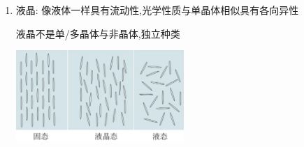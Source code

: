 \documentclass{article}
\begin{document}
\begin{enumerate}
\begin{enumerate}[label = (\arabic*)]
\begin{minipage}{0.7\textwidth}
                        非浸润时尽可能排斥固体分子(水银液面下降)

                        试管越细,那么管内的液体则越少,毛细现象越明显

                        \vspace{-1em}
                        \hspace{-0.9em}\begin{adjustbox}{minipage=0.7\linewidth, bgcolor=gray!20, padding=1em}
                            \small 
                            液面上升高度 $\, h= \dfrac{2\gamma \cos{\theta}}{\rho gr} \quad $($\theta$:液面切线与固体面所成锐角)

                            $\gamma$:表面张力系数;$\quad \theta$:接触角;$\quad \rho$:液体密度;$\quad r$:试管半径
                        \end{adjustbox}
                        \vspace{-1em}

                        下雨\textbf{踩土}(减少土壤缝隙宽度)\textbf{加强}毛细现象,减少树木根部积水

                        下雨\textbf{刨土}(使得土壤不再有缝隙)\textbf{破坏}毛细现象,增加树木根部水量
                    \end{minipage}
          \end{enumerate}

    \item 液晶: 像液体一样具有流动性,光学性质与单晶体相似具有各向异性

          \hspace{2.4em} 液晶不是单/多晶体与非晶体,独立种类

          \begin{center}
              \includegraphics[width = 0.5\textwidth]{./pictures/25.png}
          \end{center}
\end{enumerate}

\vspace{2em}
\end{document}
